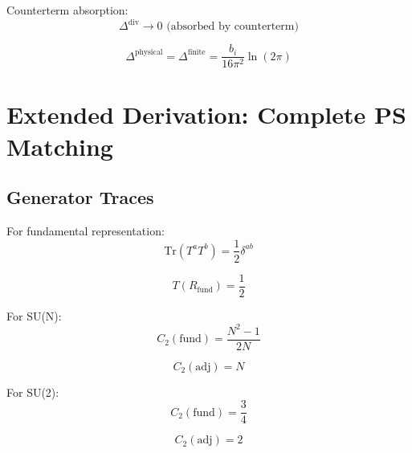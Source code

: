 \documentclass[11pt,a4paper]{article}
\theoremstyle{definition}
\begin{document}
Counterterm absorption:
\begin{equation}
\label{eq:counter_1}
\Delta^{\text{div}} \to 0 \text{ (absorbed by counterterm)}
\end{equation}

\begin{equation}
\label{eq:counter_2}
\Delta^{\text{physical}} = \Delta^{\text{finite}} = \frac{b_i}{16\pi^2}\ln(2\pi)
\end{equation}

\section{Extended Derivation: Complete PS Matching}
\label{app:ps_complete}

\subsection{Generator Traces}
\label{subsec:traces}

For fundamental representation:
\begin{equation}
\label{eq:trace_fund_1}
\text{Tr}(T^a T^b) = \frac{1}{2}\delta^{ab}
\end{equation}

\begin{equation}
\label{eq:trace_fund_2}
T(R_{\text{fund}}) = \frac{1}{2}
\end{equation}

For SU(N):
\begin{equation}
\label{eq:trace_sun_1}
C_2(\text{fund}) = \frac{N^2 - 1}{2N}
\end{equation}

\begin{equation}
\label{eq:trace_sun_2}
C_2(\text{adj}) = N
\end{equation}

For SU(2):
\begin{equation}
\label{eq:trace_su2_1}
C_2(\text{fund}) = \frac{3}{4}
\end{equation}

\begin{equation}
\label{eq:trace_su2_2}
C_2(\text{adj}) = 2
\end{equation}
\end{document}
